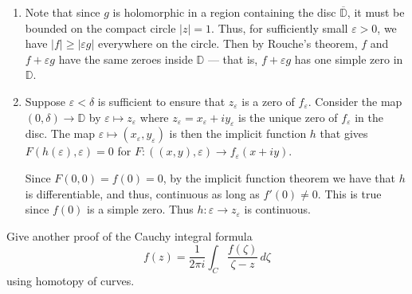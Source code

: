 \documentclass[12 pt, letterpaper]{hmcpset}
\begin{document}
\begin{solution}
	\begin{enumerate}
		\item Note that since $g$ is holomorphic in a region containing the disc $\overline{\mathbb{D}}$, it must be bounded on the compact circle $\lvert z \rvert = 1$. Thus, for sufficiently small $\varepsilon > 0$, we have $\lvert f \rvert \ge \lvert \varepsilon g \rvert$ everywhere on the circle. Then by Rouche's theorem, $f$ and $f + \varepsilon g$ have the same zeroes inside $\mathbb{D}$ --- that is, $f + \varepsilon g$ has one simple zero in $\mathbb{D}$.
		\item Suppose $\varepsilon < \delta$ is sufficient to ensure that $z_{\varepsilon}$ is a zero of $f_{\varepsilon}$. Consider the map $(0, \delta) \to \mathbb{D}$ by $\varepsilon \mapsto z_{\varepsilon}$ where $z_{\varepsilon} = x_{\varepsilon} + i y_{\varepsilon}$ is the unique zero of $f_{\varepsilon}$ in the disc. The map $\varepsilon \mapsto (x_{\varepsilon}, y_{\varepsilon})$ is then the implicit function $h$ that gives  $F(h(\varepsilon), \varepsilon) = 0$ for $F : ((x, y), \varepsilon) \to f_{\varepsilon}(x + i y)$.

			Since $F(0, 0) = f(0) = 0$, by the implicit function theorem we have that $h$ is differentiable, and thus, continuous as long as $f'(0) \neq 0$. This is true since $f(0)$ is a simple zero. Thus $h : \varepsilon \to z_{\varepsilon}$ is continuous.
	\end{enumerate}
\end{solution}

\pagebreak

\begin{problem}[18.]
	Give another proof of the Cauchy integral formula
	\[
		f(z) = \frac{1}{2 \pi i} \int_{C} \frac{f(\zeta)}{\zeta - z} \, d\zeta
	\]
	using homotopy of curves.
\end{problem}
\end{document}
